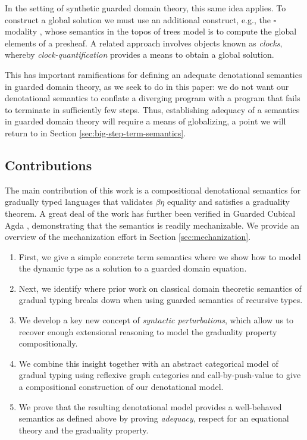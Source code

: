 In the setting of synthetic guarded domain theory, this same idea applies. To
construct a global solution we must use an additional construct, e.g., the
$\square$ modality \cite{10.1007/978-3-319-08918-8_8}, whose semantics in the
topos of trees model is to compute the global elements of a presheaf. A related
approach involves objects known as \emph{clocks}, whereby
\emph{clock-quantification} \cite{atkey-mcbride2013} provides a means to obtain
a global solution.

This has important ramifications for defining an adequate denotational semantics
in guarded domain theory, as we seek to do in this paper: we do not want our
denotational semantics to conflate a diverging program with a program that fails
to terminate in sufficiently few steps. Thus, establishing adequacy of a
semantics in guarded domain theory will require a means of globalizing,
a point we will return to in Section \ref{sec:big-step-term-semantics}.





\subsection{Contributions}

The main contribution of this work is a compositional denotational
semantics for gradually typed languages that validates $\beta\eta$
equality and satisfies a graduality theorem. A great deal of the work
has further been verified in Guarded Cubical Agda \cite{veltri-vezzosi2020}, 
demonstrating that the semantics is readily mechanizable.
We provide an overview of the mechanization effort in Section \ref{sec:mechanization}.

\begin{enumerate}
\item First, we give a simple concrete term semantics where we show
  how to model the dynamic type as a solution to a guarded domain equation.
\item Next, we identify where prior work on classical domain theoretic
  semantics of gradual typing breaks down when using guarded semantics
  of recursive types.
\item We develop a key new concept of \emph{syntactic perturbations},
  which allow us to recover enough extensional reasoning to model the
  graduality property compositionally.
\item We combine this insight together with an abstract categorical
  model of gradual typing using reflexive graph categories and
  call-by-push-value to give a compositional construction of our
  denotational model.
\item We prove that the resulting denotational model provides a
  well-behaved semantics as defined above by proving \emph{adequacy},
  respect for an equational theory and the graduality property.
\end{enumerate}

